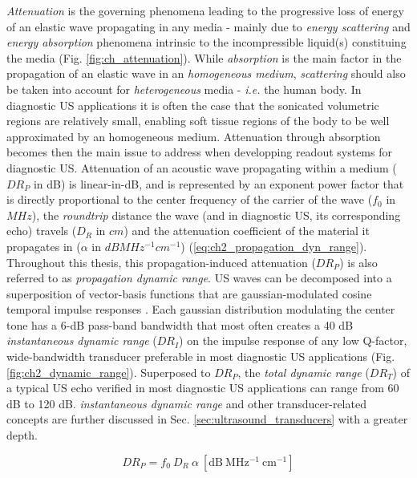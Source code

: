 \emph{Attenuation} is the governing phenomena leading to the progressive loss of energy of an elastic wave 
propagating in any media - mainly due to \emph{energy scattering} and \emph{energy absorption} phenomena intrinsic to the 
incompressible liquid(s) constituing the media (Fig. \ref{fig:ch_attenuation}). %
While \emph{absorption} is the main factor in the propagation of an elastic wave in an \emph{homogeneous medium}, 
\emph{scattering} should also be taken into account for \emph{heterogeneous} media - \emph{i.e.} the human body. In diagnostic US applications 
it is often the case that the sonicated volumetric regions are relatively small, enabling soft tissue regions of the body 
to be well approximated by an homogeneous medium. Attenuation through absorption becomes then the main 
issue to address when developping readout systems for diagnostic US. Attenuation 
of an acoustic wave propagating within a medium ($DR_P$ in dB) is linear-in-dB, and is represented by an exponent power factor that is directly proportional to 
the center frequency of the carrier of the wave ($f_0$ in $MHz$), the \emph{roundtrip} distance the wave (and in diagnostic US, its corresponding echo) 
travels ($D_R$ in $cm$) and the attenuation coefficient of the material it propagates in ($\alpha$ in $dB MHz^{-1} cm^{-1}$) (\ref{eq:ch2_propagation_dyn_range}). 
Throughout this thesis, this propagation-induced attenuation ($DR_P$) is also referred to as \emph{propagation dynamic range}. 
US waves can be decomposed into a superposition of vector-basis functions that are gaussian-modulated cosine 
temporal impulse responses \cite{}. Each gaussian distribution modulating the center tone has a 6-dB pass-band bandwidth 
that most often creates a 40 dB \emph{instantaneous dynamic range} ($DR_I$) on the impulse response of 
any low Q-factor, wide-bandwidth transducer preferable in most diagnostic US applications \cite{} (Fig. \ref{fig:ch2_dynamic_range}). Superposed 
to $DR_P$, the \emph{total dynamic range} ($DR_T$) of a typical US echo verified in most diagnostic US applications can range 
from 60 dB to 120 dB. \emph{instantaneous dynamic range} and other transducer-related concepts are 
further discussed in Sec. \ref{sec:ultrasound_transducers} with a greater depth.

\begin{equation}
  DR_P = f_0 \ D_R \ \alpha \ \mathrm{[dB \ MHz^{-1} \ cm^{-1}]}
  \label{eq:ch2_propagation_dyn_range}
\end{equation}

